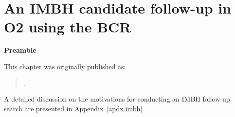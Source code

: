 \chapter[IMBH Search]{An IMBH candidate follow-up in O2 using the BCR}
\label{ch.bcr}


\textbf{Preamble}

This chapter was originally published as:

\begin{quote}
.
\end{quote}


A detailed discussion on the motivations for conducting an IMBH follow-up search are presented in Appendix~\ref{apdx.imbh}


